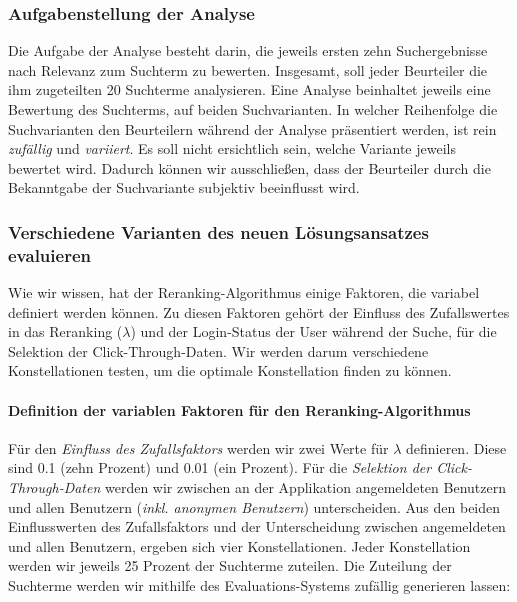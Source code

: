 \subsubsection{Aufgabenstellung der Analyse}
\label{sec:Evaluation:Aufbau:Durchfuehrung:Aufgabenstellung}

Die Aufgabe der Analyse besteht darin, die jeweils ersten zehn Suchergebnisse nach Relevanz zum Suchterm zu bewerten. Insgesamt, soll jeder Beurteiler die ihm zugeteilten 20 Suchterme analysieren. Eine Analyse beinhaltet jeweils eine Bewertung des Suchterms, auf beiden Suchvarianten. In welcher Reihenfolge die Suchvarianten den Beurteilern während der Analyse präsentiert werden, ist rein \textit{zufällig} und \textit{variiert}. Es soll nicht ersichtlich sein, welche Variante jeweils bewertet wird. Dadurch können wir ausschließen, dass der Beurteiler durch die Bekanntgabe der Suchvariante subjektiv beeinflusst wird. 

\subsubsection{Verschiedene Varianten des neuen Lösungsansatzes evaluieren}
\label{sec:Evaluation:Aufbau:Durchfuehrung:EvaluationsdatenVarianteLoesungsansatzes}

Wie wir wissen, hat der Reranking-Algorithmus einige Faktoren, die variabel definiert werden können. Zu diesen Faktoren gehört der Einfluss des Zufallswertes in das Reranking ($\lambda$) und der \glqq Login-Status der User\grqq{} während der Suche, für die Selektion der Click-Through-Daten. Wir werden darum verschiedene Konstellationen testen, um die optimale Konstellation finden zu können. 

\paragraph{Definition der variablen Faktoren für den Reranking-Algorithmus}
Für den \textit{Einfluss des Zufallsfaktors} werden wir zwei Werte für $\lambda$ definieren. Diese sind 0.1 (zehn Prozent) und 0.01 (ein Prozent). Für die \textit{Selektion der Click-Through-Daten} werden wir zwischen an der Applikation angemeldeten Benutzern und allen Benutzern (\textit{inkl. anonymen Benutzern}) unterscheiden. Aus den beiden Einflusswerten des Zufallsfaktors und der Unterscheidung zwischen angemeldeten und allen Benutzern, ergeben sich vier Konstellationen. Jeder Konstellation werden wir jeweils 25 Prozent der Suchterme zuteilen. Die Zuteilung der Suchterme werden wir mithilfe des Evaluations-Systems zufällig generieren lassen:

